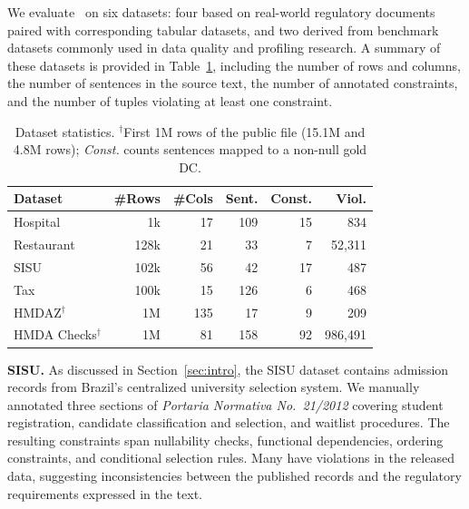 We evaluate \system\ on six datasets: four based on real-world regulatory documents paired with corresponding tabular datasets, and two derived from benchmark datasets commonly used in data quality and profiling research. A summary of these datasets is provided in Table~\ref{tab:datasets}, including the number of rows and columns, the number of sentences in the source text, the number of annotated constraints, and the number of tuples violating at least one constraint.



\begin{table}[ht]
  \centering
\small
  \begin{tabular}{lrrrrr}
    \toprule
    \textbf{Dataset} & \textbf{\#Rows} & \textbf{\#Cols} & \textbf{Sent.} & \textbf{Const.} & \textbf{Viol.} \\
    \midrule
    Hospital & 1k & 17 & 109 & 15 & 834 \\
    Restaurant & 128k & 21 & 33 & 7 & 52,311 \\
    SISU & 102k & 56 & 42 & 17 & 487 \\
    Tax & 100k & 15 & 126 & 6 & 468 \\
    HMDAZ$^{\dagger}$ & 1M & 135 & 17 & 9 & 209 \\
    HMDA Checks$^{\dagger}$ & 1M & 81 & 158 & 92 & 986,491 \\
    \bottomrule
  \end{tabular}%
    \caption{Dataset statistics. $^{\dagger}$First 1M rows of the public file (15.1M and 4.8M rows); \emph{Const.} counts sentences mapped to a non-null gold DC.}
  \label{tab:datasets}
\end{table}

\smallskip\noindent\textbf{SISU.}
As discussed in Section~\ref{sec:intro}, the SISU dataset contains admission
records from Brazil's centralized university selection system. We manually
annotated three sections of \textit{Portaria Normativa No.~21/2012} covering student
registration, candidate classification and selection, and waitlist procedures.
The resulting constraints span nullability checks, functional dependencies,
ordering constraints, and conditional selection rules. Many have violations in
the released data, suggesting inconsistencies between the published records and
the regulatory requirements expressed in the text.

